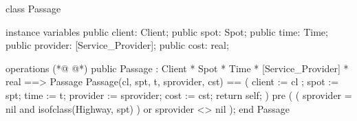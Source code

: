 \begin{vdmpp}[breaklines=true]
class Passage

instance variables
 public client: Client;
 public spot: Spot;
 public time: Time;
 public provider: [Service_Provider];
 public cost: real;
 
operations
(*@
\label{Passage:11}
@*)
 public Passage : Client * Spot * Time * [Service_Provider] * real ==> Passage
  Passage(cl, spt, t, sprovider, cst) == (
   client := cl ;
  spot := spt;
  time := t;
  provider := sprovider;
  cost := cst;
  return self;
 )
 pre
 (
  (
   sprovider = nil
   and 
   isofclass(Highway, spt)
  )
  or
   sprovider <> nil
 );
end Passage
\end{vdmpp}
